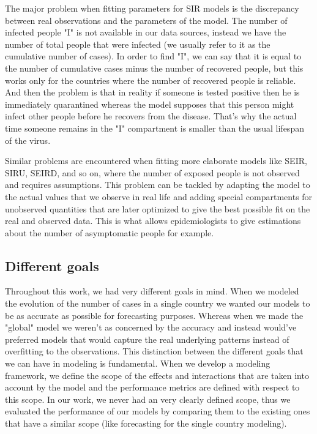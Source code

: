 \documentclass[12pt, letterpaper]{article}
\begin{document}
The major problem when fitting parameters for SIR models is the discrepancy between real observations and the parameters of the model.
The number of infected people "I" is not available in our data sources, instead we have the number of total people that were infected (we usually refer to it as the cumulative number of cases). 
In order to find "I", we can say that it is equal to the number of cumulative cases minus the number of recovered people, but this works only for the countries where the number of recovered people is reliable.
And then the problem is that in reality if someone is tested positive then he is immediately quarantined whereas the model supposes that this person might infect other people before he recovers from the disease.
That's why the actual time someone remains in the "I" compartment is smaller than the usual lifespan of the virus.

Similar problems are encountered when fitting more elaborate models like SEIR, SIRU, SEIRD, and so on, where the number of exposed people is not observed and requires assumptions. This problem can be tackled by adapting the model to the actual values that we observe in real life and adding special compartments for unobserved quantities that are later optimized to give the best possible fit on the real and observed data.
This is what allows epidemiologists to give estimations about the number of asymptomatic people for example.

\subsection{Different goals}
\label{sec:different-goals}

Throughout this work, we had very different goals in mind. 
When we modeled the evolution of the number of cases in a single country we wanted our models to be as accurate as possible for forecasting purposes.
Whereas when we made the "global" model we weren't as concerned by the accuracy and instead would've preferred models that would capture the real underlying patterns instead of overfitting to the observations.
This distinction between the different goals that we can have in modeling is fundamental.
When we develop a modeling framework, we define the scope of the effects and interactions that are taken into account by the model and the performance metrics are defined with respect to this scope.
In our work, we never had an very clearly defined scope, thus we evaluated the performance of our models by comparing them to the existing ones that have a similar scope (like forecasting for the single country modeling). 
\end{document}
